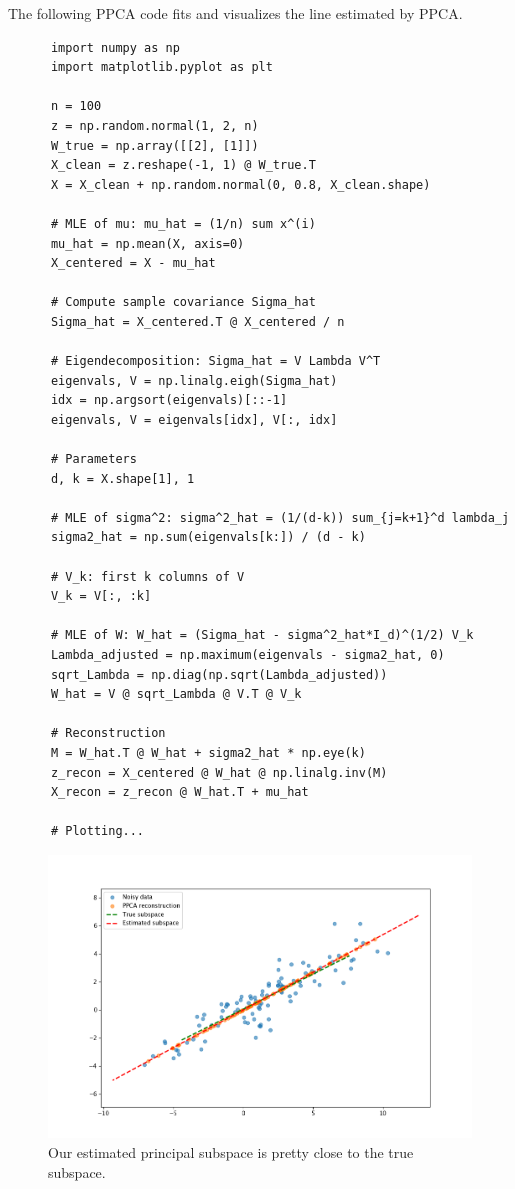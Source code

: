   \begin{example}
    The following PPCA code fits and visualizes the line estimated by PPCA.  
    \begin{lstlisting}
      import numpy as np
      import matplotlib.pyplot as plt

      n = 100
      z = np.random.normal(1, 2, n)
      W_true = np.array([[2], [1]])
      X_clean = z.reshape(-1, 1) @ W_true.T
      X = X_clean + np.random.normal(0, 0.8, X_clean.shape)

      # MLE of mu: mu_hat = (1/n) sum x^(i)
      mu_hat = np.mean(X, axis=0)
      X_centered = X - mu_hat

      # Compute sample covariance Sigma_hat
      Sigma_hat = X_centered.T @ X_centered / n

      # Eigendecomposition: Sigma_hat = V Lambda V^T
      eigenvals, V = np.linalg.eigh(Sigma_hat)
      idx = np.argsort(eigenvals)[::-1]
      eigenvals, V = eigenvals[idx], V[:, idx]

      # Parameters
      d, k = X.shape[1], 1

      # MLE of sigma^2: sigma^2_hat = (1/(d-k)) sum_{j=k+1}^d lambda_j
      sigma2_hat = np.sum(eigenvals[k:]) / (d - k)

      # V_k: first k columns of V
      V_k = V[:, :k]

      # MLE of W: W_hat = (Sigma_hat - sigma^2_hat*I_d)^(1/2) V_k
      Lambda_adjusted = np.maximum(eigenvals - sigma2_hat, 0)
      sqrt_Lambda = np.diag(np.sqrt(Lambda_adjusted))
      W_hat = V @ sqrt_Lambda @ V.T @ V_k

      # Reconstruction
      M = W_hat.T @ W_hat + sigma2_hat * np.eye(k)
      z_recon = X_centered @ W_hat @ np.linalg.inv(M)
      X_recon = z_recon @ W_hat.T + mu_hat

      # Plotting...
    \end{lstlisting}

    \begin{figure}[H]
      \centering 
      \includegraphics[scale=0.4]{img/ppca_2d.png}
      \caption{Our estimated principal subspace is pretty close to the true subspace.} 
    \end{figure}
  \end{example}

